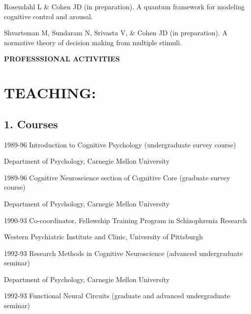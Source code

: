 \documentclass[10 pt]{article}
\begin{document}
Rosendahl L \& Cohen JD (in preparation). A quantum framework for modeling cognitive control and arousal.

Shvartsman M, Sundaram N, Srivasta V, \& Cohen JD (in preparation). A normative theory of decision making from multiple stimuli.

    \newpage


    \begin{center}
{\fontsize{15pt}{16 pt}\selectfont \textbf{PROFESSSIONAL ACTIVITIES}}
    \end{center}

\section*{TEACHING:} \label{secTEACHING}
    \smallskip

\subsection*{1. Courses} \label{secTEACHING1}
    \medskip

1989-96 \hspace{0.3in} Introduction to Cognitive Psychology (undergraduate survey course)

\hspace{0.81in} Department of Psychology, Carnegie Mellon University
    \smallskip

1989-96 \hspace{0.3in} Cognitive Neuroscience section of Cognitive Core (graduate survey course)

\hspace{0.81in} Department of Psychology, Carnegie Mellon University
    \smallskip

1990-93 \hspace{0.3in} Co-coordinator, Fellowship Training Program in Schizophrenia Research

\hspace{0.81in} Western Psychiatric Institute and Clinic, University of Pittsburgh
    \smallskip

1992-93 \hspace{0.3in} Research Methods in Cognitive Neuroscience (advanced undergraduate seminar)

\hspace{0.81in} Department of Psychology, Carnegie Mellon University
    \smallskip

1992-93 \hspace{0.3in} Functional Neural Circuits (graduate and advanced undergraduate seminar)
\end{document}
